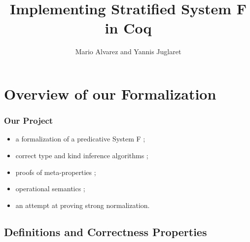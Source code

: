 \documentclass{beamer}
\title{Implementing Stratified System F in Coq}
\author{Mario Alvarez and Yannis Juglaret}
\date{\displaydate{date}}
\begin{document}
\begin{frame}
\titlepage
\end{frame}




\section{Overview of our Formalization}




\begin{frame}
  \frametitle{Our Project}

  \begin{itemize}
    \item a formalization of a predicative System F ;
    \item correct type and kind inference algorithms ;
    \item proofs of meta-properties ;
    \item operational semantics ;
    \item an attempt at proving strong normalization. 
  \end{itemize}

\end{frame}

\subsection{Definitions and Correctness Properties}
\end{document}
